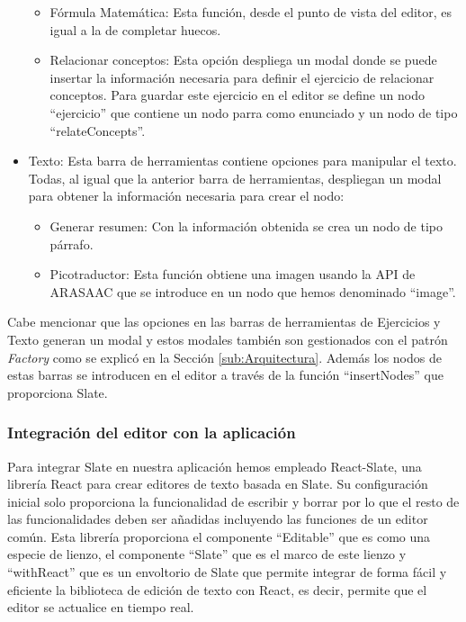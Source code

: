 \begin{itemize}
\begin{itemize}
          \item Fórmula Matemática: Esta función, desde el punto de vista del editor, es igual a la de completar huecos.
          \item Relacionar conceptos: Esta opción despliega un modal donde se puede insertar la información necesaria para definir el ejercicio de relacionar conceptos. Para guardar este ejercicio en el editor se define un nodo ``ejercicio'' que contiene un nodo parra como enunciado y un nodo de tipo ``relateConcepts''.  
        \end{itemize}
  \item Texto: Esta barra de herramientas contiene opciones para manipular el texto. Todas, al igual que la anterior barra de herramientas, despliegan un modal para obtener la información necesaria para crear el nodo:
        \begin{itemize}
          \item Generar resumen: Con la información obtenida se crea un nodo de tipo párrafo.
          \item Picotraductor: Esta función obtiene una imagen usando la API de ARASAAC que se introduce en un nodo que hemos denominado ``image''.
        \end{itemize}
\end{itemize}

Cabe mencionar que las opciones en las barras de herramientas de Ejercicios y Texto generan un modal y estos modales también son gestionados con el patrón \textit{Factory} como se explicó en la Sección \ref{sub:Arquitectura}. Además los nodos de estas barras se introducen en el editor a través de la función ``insertNodes'' que proporciona Slate.


\subsubsection{Integración del editor con la aplicación}
Para integrar Slate en nuestra aplicación hemos empleado React-Slate, una librería React para crear editores de texto basada en Slate. Su configuración inicial solo proporciona la funcionalidad de escribir y borrar por lo que el resto de las funcionalidades deben ser añadidas incluyendo las funciones de un editor común. Esta librería proporciona el componente ``Editable'' que es como una especie de lienzo, el componente ``Slate'' que es el marco de este lienzo y ``withReact'' que es un envoltorio de Slate que permite integrar de forma fácil y eficiente la biblioteca de edición de texto con React, es decir, permite que el editor se actualice en tiempo real.

